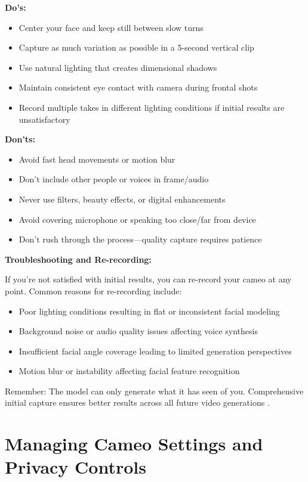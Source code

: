 \textbf{Do's:}
\begin{itemize}
\item Center your face and keep still between slow turns
\item Capture as much variation as possible in a 5-second vertical clip
\item Use natural lighting that creates dimensional shadows
\item Maintain consistent eye contact with camera during frontal shots
\item Record multiple takes in different lighting conditions if initial results are unsatisfactory
\end{itemize}

\textbf{Don'ts:}
\begin{itemize}
\item Avoid fast head movements or motion blur
\item Don't include other people or voices in frame/audio
\item Never use filters, beauty effects, or digital enhancements
\item Avoid covering microphone or speaking too close/far from device
\item Don't rush through the process—quality capture requires patience
\end{itemize}

\textbf{Troubleshooting and Re-recording:}

If you're not satisfied with initial results, you can re-record your cameo at any point. Common reasons for re-recording include:
\begin{itemize}
\item Poor lighting conditions resulting in flat or inconsistent facial modeling
\item Background noise or audio quality issues affecting voice synthesis
\item Insufficient facial angle coverage leading to limited generation perspectives
\item Motion blur or instability affecting facial feature recognition
\end{itemize}

Remember: The model can only generate what it has seen of you. Comprehensive initial capture ensures better results across all future video generations \citep{openai2024cameos}.

\section{Managing Cameo Settings and Privacy Controls}
\label{sec:cameo-management}

